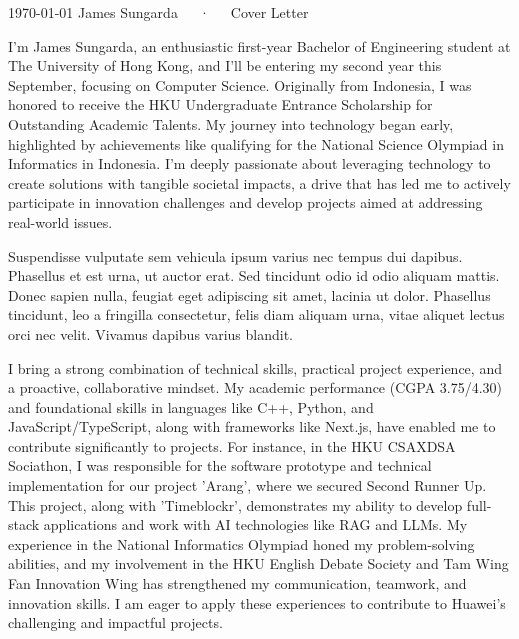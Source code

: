 \documentclass[11pt, a4paper]{awesome-cv}
\begin{document}
\makecvheader[R]

\makecvfooter
  {\today}
  {James Sungarda~~~·~~~Cover Letter}
  {}

\makelettertitle

\begin{cvletter}

I'm James Sungarda, an enthusiastic first-year Bachelor of Engineering student at The University of Hong Kong, and I'll be entering my second year this September, focusing on Computer Science. Originally from Indonesia, I was honored to receive the HKU Undergraduate Entrance Scholarship for Outstanding Academic Talents. My journey into technology began early, highlighted by achievements like qualifying for the National Science Olympiad in Informatics in Indonesia. I'm deeply passionate about leveraging technology to create solutions with tangible societal impacts, a drive that has led me to actively participate in innovation challenges and develop projects aimed at addressing real-world issues.

Suspendisse vulputate sem vehicula ipsum varius nec tempus dui dapibus. Phasellus et est urna, ut auctor erat. Sed tincidunt odio id odio aliquam mattis. Donec sapien nulla, feugiat eget adipiscing sit amet, lacinia ut dolor. Phasellus tincidunt, leo a fringilla consectetur, felis diam aliquam urna, vitae aliquet lectus orci nec velit. Vivamus dapibus varius blandit.

I bring a strong combination of technical skills, practical project experience, and a proactive, collaborative mindset. My academic performance (CGPA 3.75/4.30)  and foundational skills in languages like C++, Python, and JavaScript/TypeScript, along with frameworks like Next.js, have enabled me to contribute significantly to projects. For instance, in the HKU CSAXDSA Sociathon, I was responsible for the software prototype and technical implementation for our project 'Arang', where we secured Second Runner Up. This project, along with 'Timeblockr', demonstrates my ability to develop full-stack applications  and work with AI technologies like RAG and LLMs. My experience in the National Informatics Olympiad  honed my problem-solving abilities, and my involvement in the HKU English Debate Society  and Tam Wing Fan Innovation Wing  has strengthened my communication, teamwork, and innovation skills. I am eager to apply these experiences to contribute to Huawei's challenging and impactful projects.

\end{cvletter}


\makeletterclosing
\end{document}
